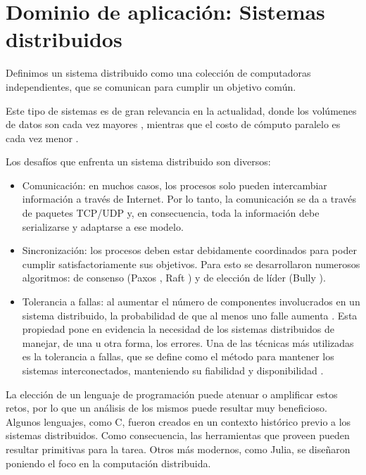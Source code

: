 \documentclass[11pt]{article}
\let\Oldsection\section
\renewcommand{\section}{\FloatBarrier\Oldsection}
\begin{document}
\section{Dominio de aplicación: Sistemas distribuidos}\label{sec:sis_dist}

Definimos un sistema distribuido como una colección de computadoras independientes, que se comunican para cumplir un objetivo común.

Este tipo de sistemas es de gran relevancia en la actualidad, donde los volúmenes de datos son cada vez mayores \cite{sis_dist:data_volume}, mientras que el costo de cómputo paralelo es cada vez menor \cite{sis_dist:compute_price}.

Los desafíos que enfrenta un sistema distribuido son diversos:

\begin{itemize}
    \item Comunicación: en muchos casos, los procesos solo pueden intercambiar información a través de Internet. Por lo tanto, la comunicación se da a través de paquetes TCP/UDP y, en consecuencia, toda la información debe serializarse y adaptarse a ese modelo.

    \item Sincronización: los procesos deben estar debidamente coordinados para poder cumplir satisfactoriamente sus objetivos. Para esto se desarrollaron numerosos algoritmos: de consenso (Paxos \cite{sis_dist:paxos}, Raft \cite{sis_dist:raft}) y de elección de líder (Bully \cite{sis_dist:bully}).
    \item Tolerancia a fallas: al aumentar el número de componentes involucrados en un sistema distribuido, la probabilidad de que al menos uno falle aumenta \cite{sis_dist:growth_fail}.
    Esta propiedad pone en evidencia la necesidad de los sistemas distribuidos de manejar, de una u otra forma, los errores. Una de las técnicas más utilizadas es la tolerancia a fallas, que se define como el método para mantener los sistemas interconectados, manteniendo su fiabilidad y disponibilidad \cite{sis_dist:fault_tol}.
\end{itemize}

La elección de un lenguaje de programación puede atenuar o amplificar estos retos, por lo que un análisis de los mismos puede resultar muy beneficioso. Algunos lenguajes, como C, fueron creados en un contexto histórico previo a los sistemas distribuidos. Como consecuencia, las herramientas que proveen pueden resultar primitivas para la tarea. Otros más modernos, como Julia, se diseñaron poniendo el foco en la computación distribuida.
\end{document}
